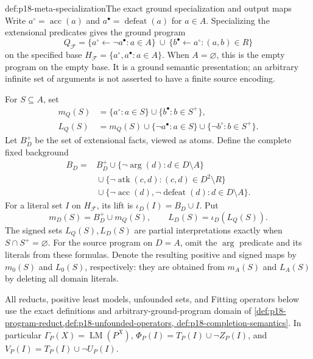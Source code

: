 \begin{hbdefinition}{def:p18-meta-specialization}{The exact ground specialization and output maps}
Write \(a^\circ=\operatorname{acc}(a)\) and
\(a^\bullet=\operatorname{defeat}(a)\) for \(a\in A\).
Specializing the extensional predicates gives the ground program
\[
 Q_{\mathcal F}=
 \{a^\circ\leftarrow\neg a^\bullet:a\in A\}
 \ \cup\
 \{b^\bullet\leftarrow a^\circ:(a,b)\in R\}
\]
on the specified base \(H_{\mathcal F}=\{a^\circ,a^\bullet:a\in A\}\).
When \(A=\varnothing\), this is the empty program on the empty base.
It is a ground semantic presentation; an arbitrary infinite set
of arguments is not asserted to have a finite source encoding.

For \(S\subseteq A\), set
\[
\begin{aligned}
 m_Q(S)&=\{a^\circ:a\in S\}\cup\{b^\bullet:b\in S^+\},\\
 L_Q(S)&=m_Q(S)\cup\{\neg a^\bullet:a\in S\}
                         \cup\{\neg b^\circ:b\in S^+\}.
\end{aligned}
\]
Let \(B_D^+\) be the set of extensional facts, viewed as atoms.
Define the complete fixed background
\[
\begin{aligned}
 B_D={}&B_D^+
 \cup\{\neg\operatorname{arg}(d):d\in D\setminus A\}\\
 &{}\cup\{\neg\operatorname{atk}(c,d):(c,d)\in D^2\setminus R\}\\
 &{}\cup\{\neg\operatorname{acc}(d),\neg\operatorname{defeat}(d):
                                                  d\in D\setminus A\}.
\end{aligned}
\]
For a literal set \(I\) on \(H_{\mathcal F}\), its lift is
\(\iota_D(I)=B_D\cup I\). Put
\[
             m_D(S)=B_D^+\cup m_Q(S),\qquad
             L_D(S)=\iota_D(L_Q(S)).
\]
The signed sets \(L_Q(S),L_D(S)\) are partial interpretations
exactly when \(S\cap S^+=\varnothing\).
For the source program on \(D=A\), omit the
\(\operatorname{arg}\) predicate and its literals from these formulas.
Denote the resulting positive and signed maps by \(m_0(S)\)
and \(L_0(S)\), respectively: they are obtained from \(m_A(S)\)
and \(L_A(S)\) by deleting all domain literals.
\end{hbdefinition}

All reducts, positive least models, unfounded sets, and Fitting
operators below use the exact definitions and arbitrary-ground-program
domain of \cref{def:p18-program-reduct,def:p18-unfounded-operators,
def:p18-completion-semantics}. In particular
\(\Gamma_P(X)=\operatorname{LM}(P^X)\),
\(\Phi_P(I)=T_P(I)\cup\neg Z_P(I)\), and
\(V_P(I)=T_P(I)\cup\neg U_P(I)\).

